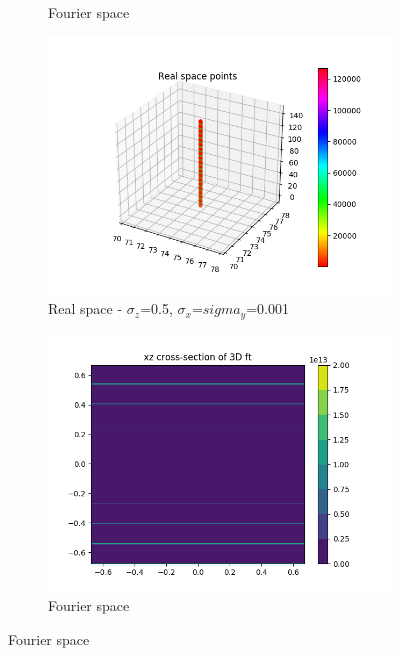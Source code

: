 \documentclass{article}
\begin{document}
\begin{figure}[h]
\begin{subfigure}{0.45\textwidth}
                \caption{Fourier space}\label{fig:fourier_3d_lowsig}
        \end{subfigure}
        \begin{subfigure}{0.45\textwidth}
                \centering
                \includegraphics[width=\textwidth]{real_3d_highzsig.png}
                \caption{Real space - $\sigma_z$=0.5, $\sigma_x$=$sigma_y$=0.001}\label{fig:real_3d_highzsig}
        \end{subfigure}
        \begin{subfigure}{0.45\textwidth}
                \centering
                \includegraphics[width=\textwidth]{fourier_3d_highzsig.png}
                \caption{Fourier space}\label{fig:fourier_3d_highzsig}

\end{subfigure}
\end{figure}
\end{document}
